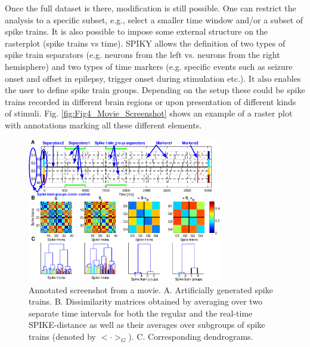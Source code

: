 \documentclass[10pt,twocolumn]{elsart5p}
\begin{document}
Once the full dataset is there, modification is still possible. One can restrict the analysis to a specific subset, e.g., select a smaller time window and/or a subset of spike trains. It is also possible to impose some external structure on the rasterplot (spike trains vs time). SPIKY allows the definition of two types of spike train separators (e.g. neurons from the left vs. neurons from the right hemisphere) and two types of time markers (e.g. specific events such as seizure onset and offset in epilepsy, trigger onset during stimulation etc.). It also enables the user to define spike train groups. Depending on the setup these could be spike trains recorded in different brain regions or upon presentation of different kinds of stimuli. Fig. \ref{fig:Fig4_Movie_Screenshot} shows an example of a raster plot with annotations marking all these different elements.
%
%
\begin{figure}
    \includegraphics[width=85mm]{Fig4_Movie_Screenshot.eps}
    \caption{\abb\label{fig:Fig4-Movie-Screenshot} Annotated screenshot from a movie.   A.				Artificially generated spike trains.   B. Dissimilarity matrices obtained by averaging 			over two separate time intervals for both the regular and the real-time SPIKE-distance 			as well as their averages over subgroups of spike trains (denoted by $<\cdot>_G$).   C. 				Corresponding dendrograms.}
\end{figure}
%
\end{document}
